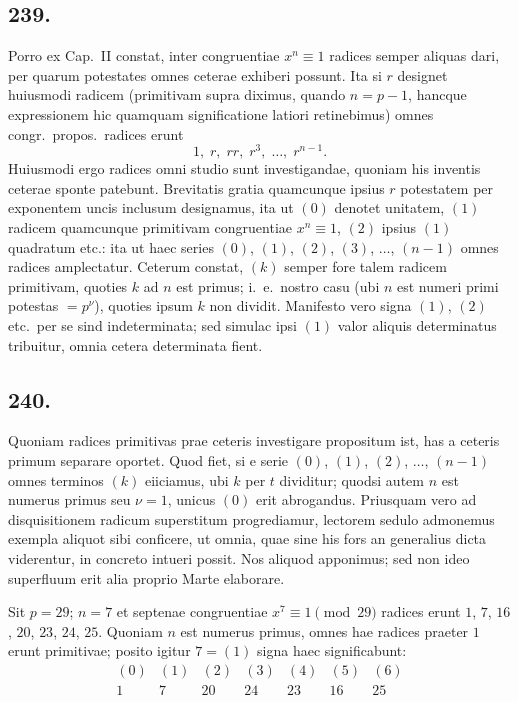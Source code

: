 \documentclass[12pt,a4paper]{article}
\begin{document}
\subsection*{239.}

Porro ex Cap.~II constat, inter congruentiae $x^n\equiv 1$ radices semper aliquas dari, per quarum potestates omnes ceterae exhiberi possunt. Ita si $r$ designet huiusmodi radicem (primitivam supra diximus, quando $n=p-1$, hancque expressionem hic quamquam significatione latiori retinebimus) omnes congr.~propos.~radices erunt
\[
1,\; r,\; rr,\; r^3,\; \ldots,\; r^{n-1}.
\]
Huiusmodi ergo radices omni studio sunt investigandae, quoniam his inventis ceterae sponte patebunt. Brevitatis gratia quamcunque ipsius $r$ potestatem per exponentem uncis inclusum designamus, ita ut $(0)$ denotet unitatem, $(1)$ radicem quamcunque primitivam congruentiae $x^n\equiv 1$, $(2)$ ipsius $(1)$ quadratum etc.: ita ut haec series $(0)$, $(1)$, $(2)$, $(3)$, $\ldots$, $(n-1)$ omnes radices amplectatur. Ceterum constat, $(k)$ semper fore talem radicem primitivam, quoties $k$ ad $n$ est primus; i.~e.~nostro casu (ubi $n$ est numeri primi potestas $=p^\nu$), quoties ipsum $k$ non dividit. Manifesto vero signa $(1)$, $(2)$ etc.~per se sind indeterminata; sed simulac ipsi $(1)$ valor aliquis determinatus tribuitur, omnia cetera determinata fient.

\subsection*{240.}

Quoniam radices primitivas prae ceteris investigare propositum ist, has a ceteris primum separare oportet. Quod fiet, si e serie $(0)$, $(1)$, $(2)$, $\ldots$, $(n-1)$ omnes terminos $(k)$ eiiciamus, ubi $k$ per $t$ dividitur; quodsi autem $n$ est numerus primus seu $\nu=1$, unicus $(0)$ erit abrogandus. Priusquam vero ad disquisitionem radicum superstitum progrediamur, lectorem sedulo admonemus exempla aliquot sibi conficere, ut omnia, quae sine his fors an generalius dicta viderentur, in concreto intueri possit. Nos aliquod apponimus; sed non ideo superfluum erit alia proprio Marte elaborare.

Sit $p=29$; $n=7$ et septenae congruentiae $x^7\equiv 1\pmod{29}$ radices erunt $1$, $7$, $16$, $20$, $23$, $24$, $25$. Quoniam $n$ est numerus primus, omnes hae radices praeter $1$ erunt primitivae; posito igitur $7=(1)$ signa haec significabunt:
\[
\begin{array}{c|ccccccc}
(0) & (1) & (2) & (3) & (4) & (5) & (6) \\ \hline
1 & 7 & 20 & 24 & 23 & 16 & 25
\end{array}
\]
\end{document}
